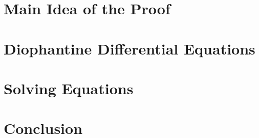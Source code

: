 \documentclass[twoside,letterpaper,10pt]{article}
\begin{document}
\domains{}

\section{Main Idea of the Proof}
\label{sec:main-idea-proof}

\section{Diophantine Differential Equations}
\label{sec:dioph-diff-equat}

\section{Solving Equations}
\label{sec:solving-equations}

\section{Conclusion}
\label{sec:conclusion}
\end{document}

